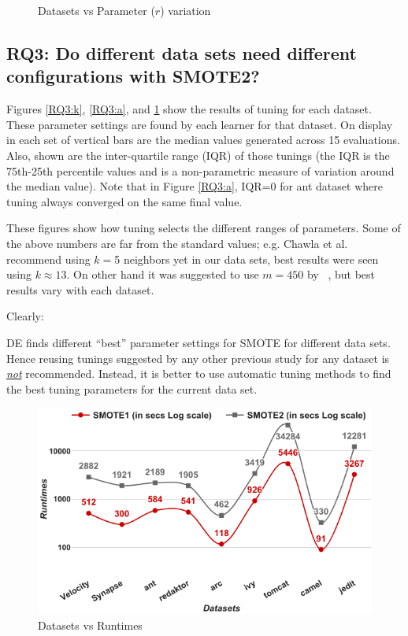 \begin{figure}[!t]
\begin{minipage}{.33\textwidth}
        \caption{Datasets vs Parameter ($r$) variation}
        \label{RQ3:b}
    \end{minipage}
\end{figure}

\subsection{\textbf{RQ3: Do different data sets
      need different configurations with SMOTE2?}}

Figures \ref{RQ3:k}, \ref{RQ3:a}, and \ref{RQ3:b} show the results of tuning for each dataset. These parameter settings are found by each learner for that dataset.
On display in each set of vertical bars are
the median values generated across 15 evaluations.
Also, shown are
the inter-quartile range (IQR) of those tunings (the IQR is the 75th-25th percentile values and is a non-parametric measure of variation
around the median value). Note that in Figure \ref{RQ3:a}, IQR=0 for  ant dataset where tuning
          always converged on the same final value.

  These figures
show how tuning selects the different ranges  of
parameters. 
Some of the above numbers are far from the standard values; e.g. Chawla et al.~\cite{chawla2002smote} recommend using $k=$5 neighbors yet in our data sets, best results were seen using $k \approx 13$. On other hand it was suggested to use $m=450$ by ~\cite{pears2014synthetic}, but best results vary with each dataset.

Clearly:
\begin{lesson}
    DE finds different ``best'' parameter settings for SMOTE for different data sets. Hence reusing tunings  suggested  by  any other  previous study  for any dataset is \underline{{\em not}} recommended. Instead,  it is better to
      use  automatic  tuning  methods  to find the best tuning parameters for the current data set.
\end{lesson}

\begin{figure}[!t]
  \captionsetup{justification=centering}
  \includegraphics[width=\linewidth]{./fig/runtimes.png}
  \caption{Datasets vs Runtimes}
  \label{runtime}
\end{figure} 

